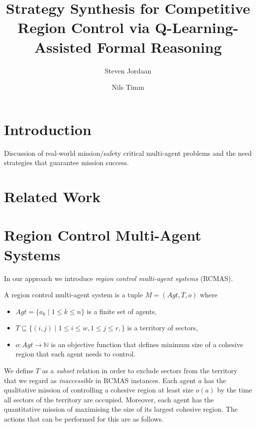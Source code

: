 \documentclass{llncs}
\begin{document}
\title{Strategy Synthesis for Competitive Region Control via 
Q-Learning-Assisted Formal Reasoning 
} 

\author{
Steven Jordaan  \and
Nils Timm 
}

\maketitle
\begin{abstract}
\end{abstract}

\section{Introduction} 
Discussion of real-world mission/safety critical multi-agent problems and the need strategies that guarantee mission success.
\section{Related Work}


\section{Region Control Multi-Agent Systems}
In our approach we introduce  \emph{region control multi-agent systems} (RCMAS).
\begin{definition} 
A region control multi-agent system is a tuple $M = (Agt, T, o)$ where
\begin{itemize}
 \item $Agt = \{a_k \mid 1 \leq k \leq n \}$ is a finite set of agents,
\item $T \subseteq  \{(i,j) \mid 1 \leq i \leq w,  1 \leq j \leq r,\}$ is a territory of sectors,
\item $o : Agt \rightarrow \mathbb{N}$ is an objective function that defines minimum size of a cohesive region that each agent needs to control.
\end{itemize}    
\end{definition}
We define $T$ as a \emph{subset} relation in order to exclude sectors from the territory that we regard as \emph{inaccessible} in RCMAS instances.  
Each agent $a$ has the qualitative mission of controlling a cohesive region at least size $o(a)$ by the time all sectors of the territory are occupied.  
Moreover, each agent has the quantitative mission of maximising the size of its largest cohesive region.
The actions that can be performed for this are as follows.
\end{document}
